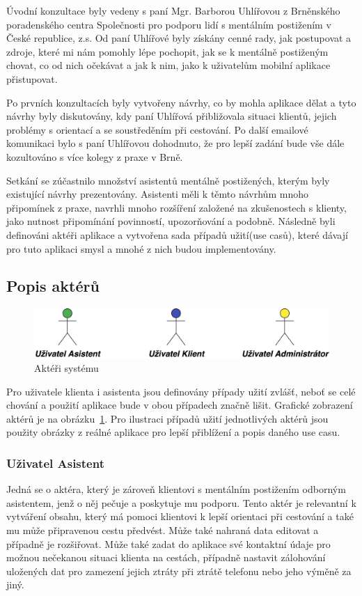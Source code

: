 \documentclass[czech,master,public,dept460,male,java,cpdeclaration]{diploma}
\begin{document}
Úvodní konzultace byly vedeny s paní Mgr. Barborou Uhlířovou z Brněnského poradenského centra
Společnosti pro podporu lidí s mentálním postižením v České republice, z.s. Od paní Uhlířové byly získány
 cenné rady, jak postupovat a zdroje, které mi nám pomohly lépe pochopit, jak se k mentálně postiženým chovat,
 co od nich očekávat a jak k nim, jako k uživatelům mobilní aplikace přistupovat.

Po prvních konzultacích byly vytvořeny návrhy, co by mohla aplikace dělat a tyto návrhy byly diskutovány,
kdy paní Uhlířová přibližovala situaci klientů, jejich problémy s orientací a se soustředěním při cestování.
Po další emailové komunikaci bylo s paní Uhlířovou dohodnuto, že pro lepší zadání bude vše dále
kozultováno s více kolegy z praxe v Brně.

Setkání se zúčastnilo množství asistentů mentálně postižených, kterým byly existující návrhy prezentovány.
Asistenti měli k těmto návrhům mnoho připomínek z praxe, navrhli mnoho rozšíření založené na zkušenostech
s klienty, jako nutnost připomínání povinností, upozorňování a podobně.
Následně byli definováni
aktéři aplikace a vytvořena sada případů užití(use casů), které dávají pro tuto aplikaci smysl a
 mnohé z nich budou implementovány.

\subsection{Popis aktérů}
\begin{figure}[H]
        \centering
                \includegraphics[scale=0.14]{img/actors.png}
        \caption{Aktéři systému}
        \label{fig:actors}
\end{figure}

Pro uživatele klienta i asistenta jsou definovány případy užití zvlášť, neboť se celé chování
a použití aplikace bude v obou případech značně lišit. Grafické zobrazení aktérů je na obrázku~\ref{fig:actors}.
Pro ilustraci případů užití jednotlivých aktérů jsou použity obrázky z reálné aplikace pro
lepší přiblížení a popis daného use casu.

\subsubsection{Uživatel Asistent}
Jedná se o aktéra, který je zároveň klientovi s mentálním postižením odborným asistentem,
jenž o něj pečuje a poskytuje mu podporu. Tento aktér je relevantní k vytváření obsahu,
který má pomoci klientovi k lepší orientaci při cestování a také mu může připravenou
cestu předvést. Může také nahraná data editovat a případně je rozšiřovat. Může také zadat
do aplikace své kontaktní údaje pro možnou nečekanou situaci klienta na cestách, případně
nastavit zálohování uložených dat pro zamezení jejich ztráty při ztrátě telefonu nebo jeho výměně
za jiný.
\end{document}
